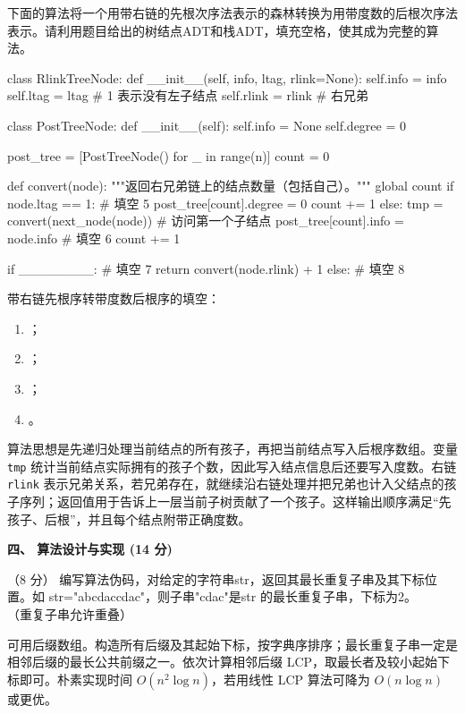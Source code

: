 \begin{question}
下面的算法将一个用带右链的先根次序法表示的森林转换为用带度数的后根次序法表示。请利用题目给出的树结点ADT和栈ADT，填充空格，使其成为完整的算法。\\
\begin{pycode}
class RlinkTreeNode:
    def __init__(self, info, ltag, rlink=None):
        self.info = info
        self.ltag = ltag       # 1 表示没有左子结点
        self.rlink = rlink     # 右兄弟


class PostTreeNode:
    def __init__(self):
        self.info = None
        self.degree = 0


post_tree = [PostTreeNode() for _ in range(n)]
count = 0


def convert(node):
    """返回右兄弟链上的结点数量（包括自己）。"""
    global count
    if node.ltag == 1:
        # 填空 5
        post_tree[count].degree = 0
        count += 1
    else:
        tmp = convert(next_node(node))   # 访问第一个子结点
        post_tree[count].info = node.info
        # 填空 6
        count += 1

    if ________:                         # 填空 7
        return convert(node.rlink) + 1
    else:
        # 填空 8
\end{pycode}
\begin{solution}
带右链先根序转带度数后根序的填空：
  \begin{enumerate}[leftmargin=2em]
    \item \texttt{}；
    \item \texttt{}；
    \item \texttt{}；
    \item \texttt{}。
  \end{enumerate}
算法思想是先递归处理当前结点的所有孩子，再把当前结点写入后根序数组。变量 \texttt{tmp} 统计当前结点实际拥有的孩子个数，因此写入结点信息后还要写入度数。右链 \texttt{rlink} 表示兄弟关系，若兄弟存在，就继续沿右链处理并把兄弟也计入父结点的孩子序列；返回值用于告诉上一层当前子树贡献了一个孩子。这样输出顺序满足“先孩子、后根”，并且每个结点附带正确度数。
\end{solution}
\end{question}

\textbf{四、 算法设计与实现 (14 分)}
\begin{question}
（8 分） 编写算法伪码，对给定的字符串str，返回其最长重复子串及其下标位置。如 str="abcdaccdac"，则子串"cdac"是str 的最长重复子串，下标为2。\\
（重复子串允许重叠）
\begin{solution}
可用后缀数组。构造所有后缀及其起始下标，按字典序排序；最长重复子串一定是相邻后缀的最长公共前缀之一。依次计算相邻后缀 LCP，取最长者及较小起始下标即可。朴素实现时间 $O(n^2\log n)$，若用线性 LCP 算法可降为 $O(n\log n)$ 或更优。
\end{solution}
\end{question}

